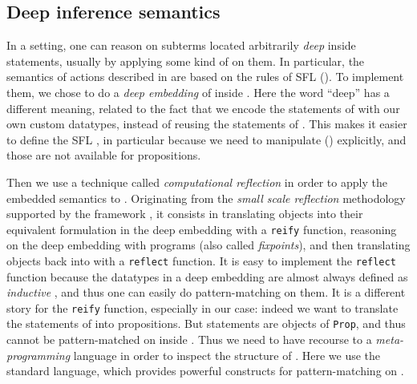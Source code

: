 \subsection{Deep inference semantics}

In a  setting, one can reason on subterms located arbitrarily
\emph{deep} inside statements, usually by applying some kind of  on them. In particular, the semantics of  actions described in
 are based on the rules of SFL (). To implement them, we
chose to do a \emph{deep embedding} of  inside .
Here the word ``deep'' has a different meaning, related to the fact that we
encode the statements of  with our own custom datatypes,
instead of reusing the statements of . This makes it easier to define
the SFL , in particular because we need to manipulate
\emph{} () explicitly, and those are
not available for  propositions.

Then we use a technique called \emph{computational reflection} in order to apply
the embedded  semantics to  . Originating from the
\emph{small scale reflection} methodology supported by the {\kl{\ssreflect}}
framework \cite{SSR}, it consists in translating  objects into their
equivalent formulation in the deep embedding with a \texttt{reify} function,
reasoning on the deep embedding with  programs (also called
\emph{fixpoints}), and then translating objects back into  with a
\texttt{reflect} function. It is easy to implement the \texttt{reflect} function
because the datatypes in a deep embedding are almost always defined as
\emph{inductive} , and thus one can easily do pattern-matching on them. It
is a different story for the \texttt{reify} function, especially in our case:
indeed we want to translate the statements of   into 
propositions. But  statements are objects of  \texttt{Prop}, and thus
cannot be pattern-matched on inside .
Thus we need to have recourse to a \emph{meta-programming} language in order to
inspect the structure of  . Here we use the standard {\ltac} language,
which provides powerful constructs for pattern-matching on .


